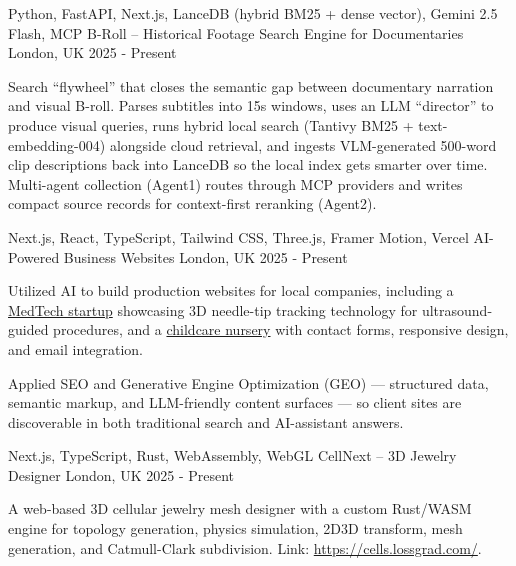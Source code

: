 \begin{cventries}
  \cventry
    {Python, FastAPI, Next.js, LanceDB (hybrid BM25 + dense vector), Gemini 2.5 Flash, MCP} %
    {B-Roll -- Historical Footage Search Engine for Documentaries} %
    {London, UK} %
    {2025 - Present} %
    {
      \begin{cvitems} %
        \item {Search ``flywheel'' that closes the semantic gap between documentary narration and visual B-roll. Parses subtitles into 15s windows, uses an LLM ``director'' to produce visual queries, runs hybrid local search (Tantivy BM25 + text-embedding-004) alongside cloud retrieval, and ingests VLM-generated 500-word clip descriptions back into LanceDB so the local index gets smarter over time. Multi-agent collection (Agent1) routes through MCP providers and writes compact source records for context-first reranking (Agent2).}
      \end{cvitems}
    }

  \cventry
    {Next.js, React, TypeScript, Tailwind CSS, Three.js, Framer Motion, Vercel} %
    {AI-Powered Business Websites} %
    {London, UK} %
    {2025 - Present} %
    {
      \begin{cvitems} %
        \item {Utilized AI to build production websites for local companies, including a \href{https://beacon.lossgrad.com/}{MedTech startup} showcasing 3D needle-tip tracking technology for ultrasound-guided procedures, and a \href{https://www.wonderlanddaynursery.co.uk/}{childcare nursery} with contact forms, responsive design, and email integration.}
        \item {Applied SEO and Generative Engine Optimization (GEO) — structured data, semantic markup, and LLM-friendly content surfaces — so client sites are discoverable in both traditional search and AI-assistant answers.}
      \end{cvitems}
    }

  \cventry
    {Next.js, TypeScript, Rust, WebAssembly, WebGL} %
    {CellNext -- 3D Jewelry Designer} %
    {London, UK} %
    {2025 - Present} %
    {
      \begin{cvitems} %
        \item {A web-based 3D cellular jewelry mesh designer with a custom Rust/WASM engine for topology generation, physics simulation, 2D\textrightarrow3D transform, mesh generation, and Catmull-Clark subdivision. Link: \href{https://cells.lossgrad.com/}{https://cells.lossgrad.com/}.}
      \end{cvitems}
    }


\end{cventries}

